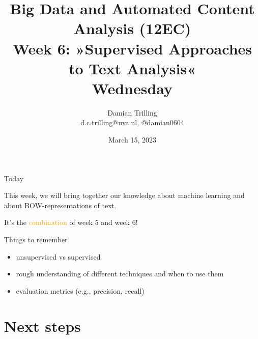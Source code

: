 

\graphicspath{{../../resources/img/}}




\title[Big Data and Automated Content Analysis]{\textbf{Big Data and Automated Content Analysis (12EC)} 
\\Week 6: »Supervised Approaches to Text Analysis«
\\Wednesday}
\author[Damian Trilling]{Damian Trilling\\ \footnotesize{d.c.trilling@uva.nl, @damian0604 \\}}
\date{March 15, 2023}


\begin{frame}{}
	\titlepage
\end{frame}

\begin{frame}{Today}
	\tableofcontents
\end{frame}




\begin{frame}[standout]
This week, we will bring together our knowledge about machine learning and about BOW-representations of text.

It's the \textcolor{orange}{combination} of week 5 and week 6!
\end{frame}










\begin{frame}{Things to remember}
  \begin{itemize}
  \item unsupervised vs supervised
  \item rough understanding of different techniques and when to use them
  \item evaluation metrics (e.g., precision, recall)
\end{itemize}
\end{frame}

\section{Next steps}




